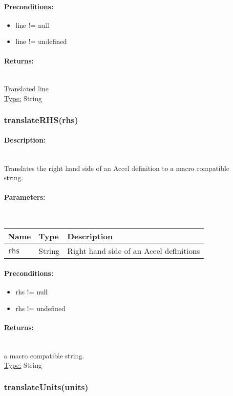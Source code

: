 \paragraph{Preconditions:} 
\begin{itemize}  
\item  line != null
\item  line != undefined
\end{itemize}  
\paragraph{Returns:} \hfill \\ 
Translated line\\ 
\underline{Type:} String
\subsubsection{translateRHS(rhs)} 
\paragraph{Description:} \hfill \\ 
Translates the right hand side of an Accel definition to a macro compatible string.
\paragraph{Parameters:} \hfill \\ 
\begin{tabular}{|l|l|l|}
\hline
\textbf{Name} & \textbf{Type} & \textbf{Description} \\ 
\hline
\texttt{rhs} & String & Right hand side of an Accel definitions\\ 
\hline
\end{tabular}
\paragraph{Preconditions:} 
\begin{itemize}  
\item  rhs != null
\item  rhs != undefined
\end{itemize}  
\paragraph{Returns:} \hfill \\ 
a macro compatible string.\\ 
\underline{Type:} String
\subsubsection{translateUnits(units)} 
